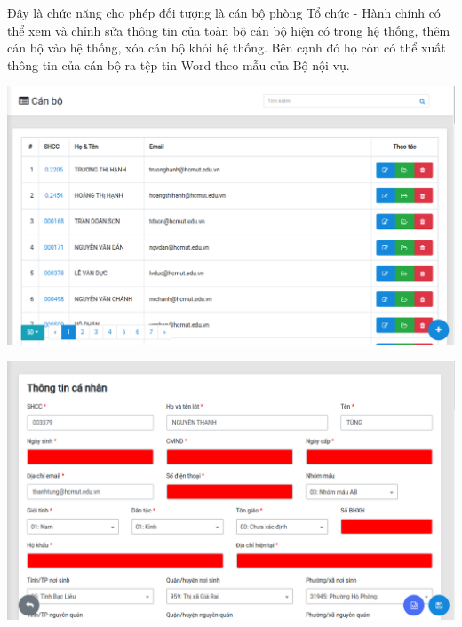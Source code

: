 Đây là chức năng cho phép đối tượng là cán bộ phòng Tổ chức - Hành chính có thể xem và chỉnh sửa thông tin của toàn bộ cán bộ hiện có trong hệ thống, thêm cán bộ vào hệ thống, xóa cán bộ khỏi hệ thống. Bên cạnh đó họ còn có thể xuất thông tin của cán bộ ra tệp tin Word theo mẫu của Bộ nội vụ.\\
\begin{center}
  \captionsetup{type=figure}
  \includegraphics[width=15cm]{img/Screen/allcanbo.png}
\end{center}
\begin{center}
  \captionsetup{type=figure}
  \includegraphics[width=15cm]{img/Screen/editthongtin.png}
\end{center}
